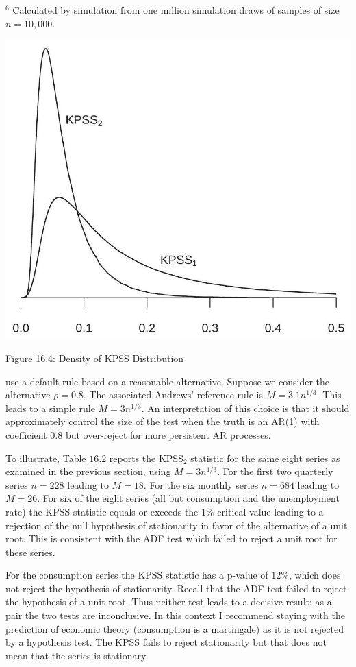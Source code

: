 \documentclass[10pt]{article}
\begin{document}
${ }^{6}$ Calculated by simulation from one million simulation draws of samples of size $n=10,000$.

\includegraphics[max width=\textwidth]{2022_10_23_e99fc7c58db661c6f219g-24}

Figure 16.4: Density of KPSS Distribution

use a default rule based on a reasonable alternative. Suppose we consider the alternative $\rho=0.8$. The associated Andrews' reference rule is $M=3.1 n^{1 / 3}$. This leads to a simple rule $M=3 n^{1 / 3}$. An interpretation of this choice is that it should approximately control the size of the test when the truth is an AR(1) with coefficient $0.8$ but over-reject for more persistent AR processes.

To illustrate, Table $16.2$ reports the $\mathrm{KPSS}_{2}$ statistic for the same eight series as examined in the previous section, using $M=3 n^{1 / 3}$. For the first two quarterly series $n=228$ leading to $M=18$. For the six monthly series $n=684$ leading to $M=26$. For six of the eight series (all but consumption and the unemployment rate) the KPSS statistic equals or exceeds the $1 \%$ critical value leading to a rejection of the null hypothesis of stationarity in favor of the alternative of a unit root. This is consistent with the ADF test which failed to reject a unit root for these series.

For the consumption series the KPSS statistic has a p-value of $12 \%$, which does not reject the hypothesis of stationarity. Recall that the ADF test failed to reject the hypothesis of a unit root. Thus neither test leads to a decisive result; as a pair the two tests are inconclusive. In this context I recommend staying with the prediction of economic theory (consumption is a martingale) as it is not rejected by a hypothesis test. The KPSS fails to reject stationarity but that does not mean that the series is stationary.
\end{document}

